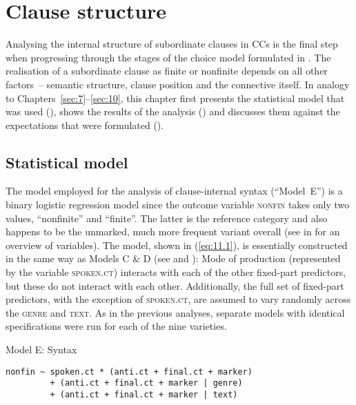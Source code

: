 \chapter{Clause structure}\label{bkm:Ref1727507}\label{ch:11}\label{sec:11}\largerpage

Analysing the internal structure of subordinate clauses in CCs is the final step when progressing through the stages of the choice model formulated in . The realisation of a subordinate clause as finite or nonfinite depends on all other factors~– semantic structure, clause position and the connective itself. In analogy to Chapters~\ref{sec:7}–\ref{sec:10}, this chapter first presents the statistical model that was used (), shows the results of the analysis () and discusses them against the expectations that were formulated ().

\section{\label{bkm:Ref75782456}Statistical model}\label{sec:11.1}

The model employed for the analysis of clause-internal syntax (“Model~E”) is a binary logistic regression model since the outcome variable \textsc{nonfin} takes only two values, “nonfinite”  and “finite”. The latter is the reference category and also happens to be the unmarked, much more frequent variant overall (see  in  for an overview of variables). The model, shown in (\ref{eq:11.1}), is essentially constructed in the same way as Models C \& D (see  and ): Mode of production (represented by the variable \textsc{spoken.ct}) interacts with each of the other fixed-part predictors, but these do not interact with each other. Additionally, the full set of fixed-part predictors, with the exception of \textsc{spoken.ct}, are assumed to vary randomly across the  \textsc{genre} and \textsc{text}. As in the previous analyses, separate models with identical specifications were run for each of the nine varieties.

\ea
\label{bkm:Ref75782842}\label{eq:11.1}  
Model E: Syntax
\begin{lstlisting}
nonfin ~ spoken.ct * (anti.ct + final.ct + marker)
         + (anti.ct + final.ct + marker | genre)
         + (anti.ct + final.ct + marker | text)
\end{lstlisting}
\z


